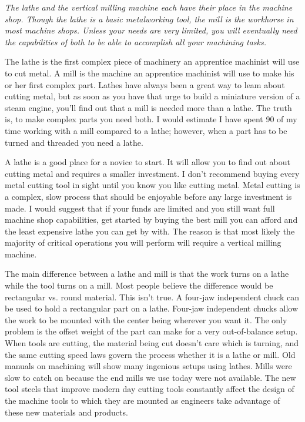 \secdown

\textit{The lathe and the vertical milling machine each have their place in the
machine shop. Though the lathe is a basic metalworking tool, the mill is the
workhorse in most machine shops. Unless your needs are very limited, you will
eventually need the capabilities of both to be able to accomplish all your
machining tasks.}
\bigskip


The lathe is the first complex piece of machinery an apprentice machinist will
use to cut metal. A mill is the machine an apprentice machinist will use to make
his or her first complex part. Lathes have always been a great way to leam about
cutting metal, but as soon as you have that urge to build a miniature version of
a steam engine, you'll find out that a mill is needed more than a lathe. The
truth is, to make complex parts you need both. I would estimate I have spent 90%
of my time working with a mill compared to a lathe; however, when a part has to
be turned and threaded you need a lathe.

A lathe is a good place for a novice to start. It will allow you to find out
about cutting metal and requires a smaller investment. I don't recommend buying
every metal cutting tool in sight until you know you like cutting metal. Metal
cutting is a complex, slow process that should be enjoyable before any large
investment is made. I would suggest that if your funds are limited and you still
want full machine shop capabilities, get started by buying the best mill you can
afford and the least expensive lathe you can get by with. The reason is that
most likely the majority of critical operations you will perform will require a
vertical milling machine.


The main difference between a lathe and mill is that the work turns on a lathe
while the tool turns on a mill. Most people believe the difference would be
rectangular vs. round material. This isn't true. A four-jaw independent chuck
can be used to hold a rectangular part on a lathe. Four-jaw independent chucks
allow the work to be mounted with the center being wherever you want it. The
only problem is the offset weight of the part can make for a very out-of-balance
setup. When tools are cutting, the material being cut doesn't care which is
turning, and the same cutting speed laws govern the process whether it is a
lathe or mill. Old manuals on machining will show many ingenious setups using
lathes. Mills were slow to catch on because the end mills we use today were not
available. The new tool steels that improve modern day cutting tools constantly
affect the design of the machine tools to which they are mounted as engineers
take advantage of these new materials and products.

